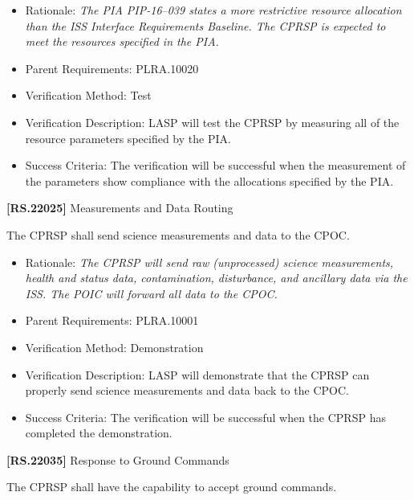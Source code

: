 \begin{itemize}
\item{} Rationale: \emph{The PIA PIP-16--039 states a more restrictive resource allocation than the ISS Interface Requirements Baseline. The CPRSP is expected to meet the resources specified in the PIA.}

\item{} Parent Requirements: PLRA.10020

\item{} Verification Method: Test

\item{} Verification Description: \gls{LASP} will \gls{test} the \gls{CPRSP} by measuring all of the resource parameters specified by the \gls{PIA}.

\item{} Success Criteria: The verification will be successful when the \gls{measure}ment of the parameters show compliance with the allocations specified by the \gls{PIA}.

\end{itemize}

\textbf{[RS.22025]} Measurements and Data Routing

The \gls{CPRSP} shall send science \gls{measure}ments and data to the \gls{CPOC}.

\begin{itemize}
\item{} Rationale: \emph{The CPRSP will send raw (unprocessed) science measurements, health and status data, contamination, disturbance, and ancillary data via the ISS. The POIC will forward all data to the CPOC.}

\item{} Parent Requirements: PLRA.10001

\item{} Verification Method: Demonstration

\item{} Verification Description: \gls{LASP} will demonstrate that the \gls{CPRSP} can properly send science \gls{measure}ments and data back to the \gls{CPOC}.

\item{} Success Criteria: The verification will be successful when the \gls{CPRSP} has completed the \gls{demonstration}.

\end{itemize}

\textbf{[RS.22035]} Response to Ground Commands

The \gls{CPRSP} shall have the capability to accept ground commands.

